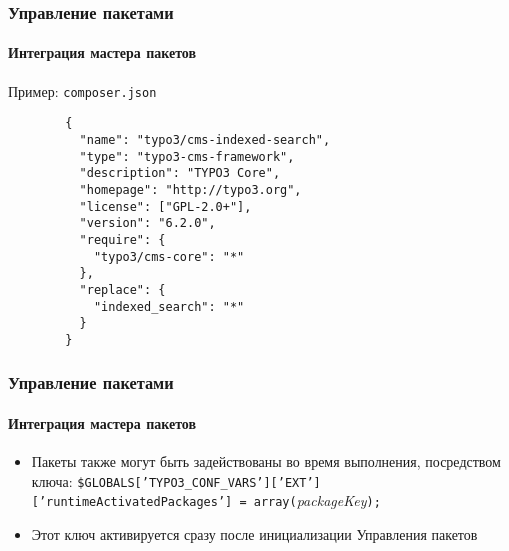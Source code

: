 
\begin{frame}[fragile]
	\frametitle{Управление пакетами}
	\framesubtitle{Интеграция мастера пакетов}

	Пример: \texttt{composer.json}

	\lstset{
		basicstyle=\tiny\ttfamily
	}

	\begin{lstlisting}
		{
		  "name": "typo3/cms-indexed-search",
		  "type": "typo3-cms-framework",
		  "description": "TYPO3 Core",
		  "homepage": "http://typo3.org",
		  "license": ["GPL-2.0+"],
		  "version": "6.2.0",
		  "require": {
		    "typo3/cms-core": "*"
		  },
		  "replace": {
		    "indexed_search": "*"
		  }
		}
	\end{lstlisting}

\end{frame}


\begin{frame}[fragile]
	\frametitle{Управление пакетами}
	\framesubtitle{Интеграция мастера пакетов}

	\lstset{
		basicstyle=\smaller\ttfamily
	}

	\begin{itemize}
		\item Пакеты также могут быть задействованы во время выполнения, посредством ключа:
			\smaller\texttt{\$GLOBALS['TYPO3\_CONF\_VARS']['EXT']['runtimeActivatedPackages'] = array(}\space\textit{packageKey}\space\texttt{);}\normalsize

		\item Этот ключ активируется сразу после инициализации Управления пакетов

	\end{itemize}

\end{frame}


